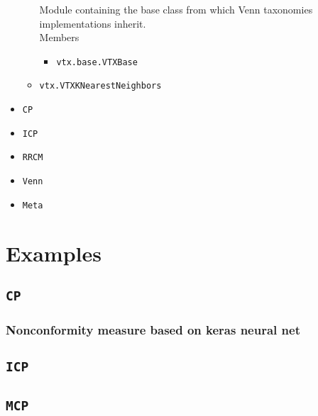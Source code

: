 \documentclass[twoside,11pt]{article}
\begin{document}
\begin{appendices}
\begin{itemize}
\begin{itemize}
          Module containing the base class from which Venn
          taxonomies implementations inherit.
          \\

          Members

          \begin{itemize}

            \item
              \texttt{vtx.base.VTXBase}

          \end{itemize}

        \item \texttt{vtx.VTXKNearestNeighbors}

      \end{itemize}

    \item \texttt{CP}

    \item \texttt{ICP}

    \item \texttt{RRCM}

    \item \texttt{Venn}

    \item \texttt{Meta}

  \end{itemize}


  \section{Examples}
  \label{appendix:b}

  \subsection{\texttt{CP}}
    \subsubsection{Nonconformity measure based on keras
                   neural net}
  \subsection{\texttt{ICP}}
  \subsection{\texttt{MCP}}

\end{appendices}
\end{document}
